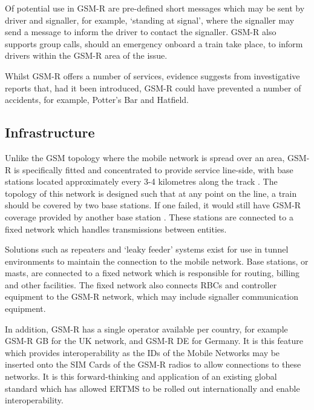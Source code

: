 \documentclass[twoside,11pt,a4paper]{article}
\begin{document}
Of potential use in GSM-R are pre-defined short messages which may be sent by driver and signaller, for example, `standing at signal'\citep{RSSB12a}, where the signaller may send a message to inform the driver to contact the signaller. GSM-R also supports group calls, should an emergency onboard a train take place, to inform drivers within the GSM-R area of the issue.

Whilst GSM-R offers a number of services, evidence suggests from investigative reports that, had it been introduced, GSM-R could have prevented a number of accidents, for example, Potter's Bar and Hatfield.

\subsection{Infrastructure}
Unlike the GSM topology where the mobile network is spread over an area, GSM-R is specifically fitted and concentrated to provide service line-side, with base stations located approximately every 3-4 kilometres along the track \citep[p. 509]{Dudoyer12a}. The topology of this network is designed such that at any point on the line, a train should be covered by two base stations. If one failed, it would still have GSM-R coverage provided by another base station \citep{GSM-R14a} \citep{Franekova11a}. These stations are connected to a fixed network which handles transmissions between entities.

Solutions such as repeaters and `leaky feeder' systems exist for use in tunnel environments to maintain the connection to the mobile network. Base stations, or masts, are connected to a fixed network which is responsible for routing, billing and other facilities. The fixed network also connects RBCs and controller equipment to the GSM-R network, which may include signaller communication equipment.

In addition, GSM-R has a single operator available per country, for example GSM-R GB for the UK network, and GSM-R DE for Germany. It is this feature which provides interoperability as the IDs of the Mobile Networks may be inserted onto the SIM Cards of the GSM-R radios to allow connections to these networks. It is this forward-thinking and application of an existing global standard which has allowed ERTMS to be rolled out internationally and enable interoperability.
\end{document}
